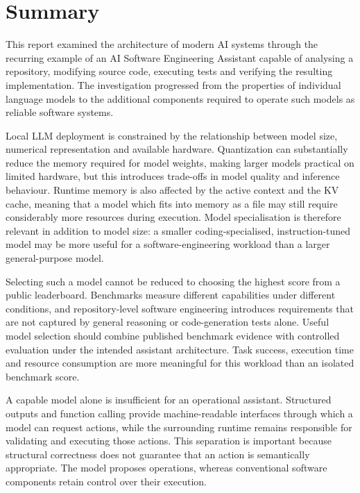 \chapter{Summary}
\label{chap:summary}

This report examined the architecture of modern AI systems through the recurring example of an AI Software Engineering Assistant capable of analysing a repository, modifying source code, executing tests and verifying the resulting implementation. The investigation progressed from the properties of individual language models to the additional components required to operate such models as reliable software systems.

Local LLM deployment is constrained by the relationship between model size, numerical representation and available hardware. Quantization can substantially reduce the memory required for model weights, making larger models practical on limited hardware, but this introduces trade-offs in model quality and inference behaviour. Runtime memory is also affected by the active context and the KV cache, meaning that a model which fits into memory as a file may still require considerably more resources during execution. Model specialisation is therefore relevant in addition to model size: a smaller coding-specialised, instruction-tuned model may be more useful for a software-engineering workload than a larger general-purpose model.

Selecting such a model cannot be reduced to choosing the highest score from a public leaderboard. Benchmarks measure different capabilities under different conditions, and repository-level software engineering introduces requirements that are not captured by general reasoning or code-generation tests alone. Useful model selection should combine published benchmark evidence with controlled evaluation under the intended assistant architecture. Task success, execution time and resource consumption are more meaningful for this workload than an isolated benchmark score.

A capable model alone is insufficient for an operational assistant. Structured outputs and function calling provide machine-readable interfaces through which a model can request actions, while the surrounding runtime remains responsible for validating and executing those actions. This separation is important because structural correctness does not guarantee that an action is semantically appropriate. The model proposes operations, whereas conventional software components retain control over their execution.

